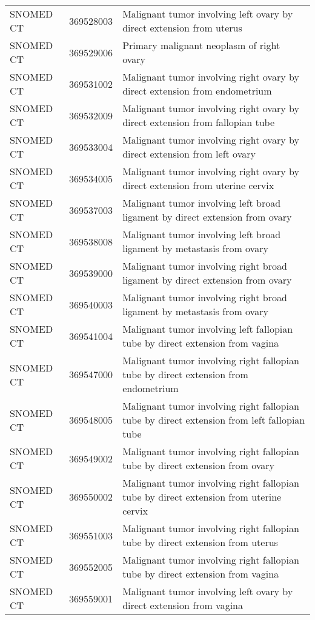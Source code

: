 \begin{longtable}{p{}p{}p{}}
  SNOMED CT & 369528003 & Malignant tumor involving left ovary by direct extension from uterus \\ 
  SNOMED CT & 369529006 & Primary malignant neoplasm of right ovary \\ 
  SNOMED CT & 369531002 & Malignant tumor involving right ovary by direct extension from endometrium \\ 
  SNOMED CT & 369532009 & Malignant tumor involving right ovary by direct extension from fallopian tube \\ 
  SNOMED CT & 369533004 & Malignant tumor involving right ovary by direct extension from left ovary \\ 
  SNOMED CT & 369534005 & Malignant tumor involving right ovary by direct extension from uterine cervix \\ 
  SNOMED CT & 369537003 & Malignant tumor involving left broad ligament by direct extension from ovary \\ 
  SNOMED CT & 369538008 & Malignant tumor involving left broad ligament by metastasis from ovary \\ 
  SNOMED CT & 369539000 & Malignant tumor involving right broad ligament by direct extension from ovary \\ 
  SNOMED CT & 369540003 & Malignant tumor involving right broad ligament by metastasis from ovary \\ 
  SNOMED CT & 369541004 & Malignant tumor involving left fallopian tube by direct extension from vagina \\ 
  SNOMED CT & 369547000 & Malignant tumor involving right fallopian tube by direct extension from endometrium \\ 
  SNOMED CT & 369548005 & Malignant tumor involving right fallopian tube by direct extension from left fallopian tube \\ 
  SNOMED CT & 369549002 & Malignant tumor involving right fallopian tube by direct extension from ovary \\ 
  SNOMED CT & 369550002 & Malignant tumor involving right fallopian tube by direct extension from uterine cervix \\ 
  SNOMED CT & 369551003 & Malignant tumor involving right fallopian tube by direct extension from uterus \\ 
  SNOMED CT & 369552005 & Malignant tumor involving right fallopian tube by direct extension from vagina \\ 
  SNOMED CT & 369559001 & Malignant tumor involving left ovary by direct extension from vagina \\ 

\end{longtable}
